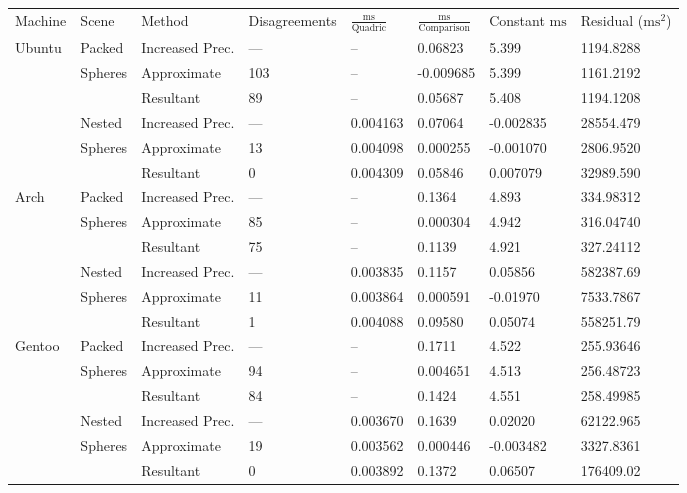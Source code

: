 \begin{tabular}{|l|l|ll|lll|l|}
\hline
Machine & Scene & Method & Disagreements & $\frac{\text{ms}}{\text{Quadric}}$ & $\frac{\text{ms}}{\text{Comparison}}$ & Constant $\text{ms}$ & Residual ($\text{ms}^2$)\\
\hhline{|=|=|==|===|=|}
Ubuntu & Packed & Increased Prec. & \hphantom{1}--- & -- & \hphantom{-}0.06823 & \hphantom{-}5.399 & \hphantom{10}1194.8288\\
& Spheres & Approximate & 103 & -- & -0.009685 & \hphantom{-}5.399 & \hphantom{10}1161.2192\\
&& Resultant & \hphantom{1}89 & -- & \hphantom{-}0.05687 & \hphantom{-}5.408 & \hphantom{10}1194.1208\\
\hline
& Nested & Increased Prec. & \hphantom{1}--- & 0.004163 & \hphantom{-}0.07064 & -0.002835 & \hphantom{1}28554.479\\
& Spheres & Approximate & \hphantom{1}13 & 0.004098 & \hphantom{-}0.000255 & -0.001070 & \hphantom{10}2806.9520\\
&& Resultant & \hphantom{10}0 & 0.004309 & \hphantom{-}0.05846 & \hphantom{-}0.007079 & \hphantom{1}32989.590\\
\hline
Arch & Packed & Increased Prec. & \hphantom{1}--- & -- & \hphantom{-}0.1364 & \hphantom{-}4.893 & \hphantom{100}334.98312\\
& Spheres & Approximate & \hphantom{1}85 & -- & \hphantom{-}0.000304 & \hphantom{-}4.942 & \hphantom{100}316.04740\\
&& Resultant & \hphantom{1}75 & -- & \hphantom{-}0.1139 & \hphantom{-}4.921 & \hphantom{100}327.24112\\
\hline
& Nested & Increased Prec. & \hphantom{1}--- & 0.003835 & \hphantom{-}0.1157 & \hphantom{-}0.05856 & 582387.69\\
& Spheres & Approximate & \hphantom{1}11 & 0.003864 & \hphantom{-}0.000591 & -0.01970 & \hphantom{10}7533.7867\\
&& Resultant & \hphantom{10}1 & 0.004088 & \hphantom{-}0.09580 & \hphantom{-}0.05074 & 558251.79\\
\hline
Gentoo & Packed & Increased Prec. & \hphantom{1}--- & -- & \hphantom{-}0.1711 & \hphantom{-}4.522 & \hphantom{100}255.93646\\
& Spheres & Approximate & \hphantom{1}94 & -- & \hphantom{-}0.004651 & \hphantom{-}4.513 & \hphantom{100}256.48723\\
&& Resultant & \hphantom{1}84 & -- & \hphantom{-}0.1424 & \hphantom{-}4.551 & \hphantom{100}258.49985\\
\hline
& Nested & Increased Prec. & \hphantom{1}--- & 0.003670 & \hphantom{-}0.1639 & \hphantom{-}0.02020 & \hphantom{1}62122.965\\
& Spheres & Approximate & \hphantom{1}19 & 0.003562 & \hphantom{-}0.000446 & -0.003482 & \hphantom{10}3327.8361\\
&& Resultant & \hphantom{10}0 & 0.003892 & \hphantom{-}0.1372 & \hphantom{-}0.06507 & 176409.02\\
\hline
\end{tabular}
